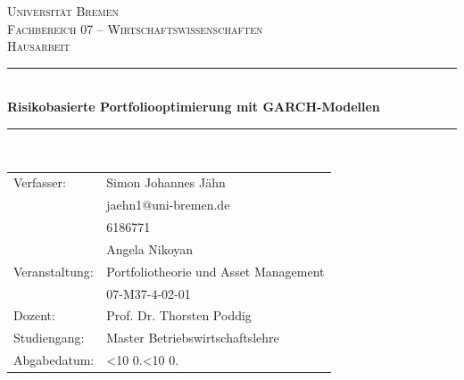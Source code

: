 \begin{titlepage}
\thispagestyle{empty}
\setcounter{page}{0}
\newcommand{\HRule}{\rule{\linewidth}{0.5mm}}
\hspace{1cm}
\center

\textsc{\huge Universität Bremen}\\[1.6cm]
\textsc{\Large Fachbereich 07 -- Wirtschaftswissenschaften}\\[0.8cm]
\MSonehalfspacing
\textsc{\Large Hausarbeit}\\[0.8cm]

\HRule\\[1cm]
\MSdoublespacing
{ \huge \bfseries Risikobasierte Portfoliooptimierung mit GARCH-Modellen}\\[0.2cm]
\HRule \\[0.8cm]
\MSonehalfspacing

	\begin{tabular}{ll}
		\large{Verfasser:}		& \large{Simon Johannes Jähn} \\
		& \normalsize{jaehn1@uni-bremen.de} \\
		& 6186771 \\[0.3cm]
		& \large{Angela Nikoyan}
		\vspace{0.6cm}\\
			\large{Veranstaltung:}	& \large{Portfoliotheorie und Asset Management} \\
		& \normalsize{07-M37-4-02-01}
		\vspace{0.6cm}\\
			\large{Dozent:}		& \large{Prof. Dr. Thorsten Poddig}
		\vspace{0.6cm}\\
			\large{Studiengang:}		& \large{Master Betriebswirtschaftslehre}
		\vspace{0.6cm}\\
			\large{Abgabedatum:}		& \large{\ifnum\day<10 0\fi\the\day.\ifnum\month<10 0\fi\the\month.\the\year}
	\end{tabular}


\end{titlepage}
\restoregeometry

\pagestyle{fancy}

\setcounter{tocdepth}{2}
\tableofcontents
{}

\newpage
{}
\listoffigures

\newpage
{}
\listoftables
{}

\MSonehalfspacing
\newpage
